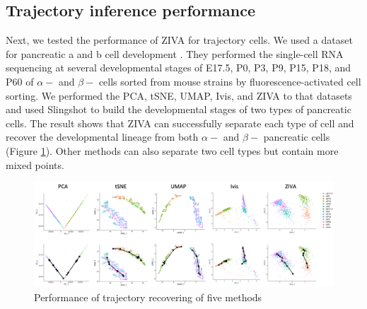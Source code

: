 \begin{table}[htb!]
\centering
\caption{ARI of clustering performance of seven methods on six datasets}
\label{ariall}
\end{table}

\clearpage

\subsection{Trajectory inference performance}
Next, we tested the performance of ZIVA for trajectory cells. We used a dataset for pancreatic a and b cell development \cite{qiu2017deciphering}. They performed the single-cell RNA sequencing at several developmental stages of E17.5, P0, P3, P9, P15, P18, and P60 of $\alpha-$ and $\beta-$ cells sorted from mouse strains by fluorescence-activated cell sorting. We performed the PCA, tSNE, UMAP, Ivis, and ZIVA to that datasets and used Slingshot \cite{street2018slingshot} to build the developmental stages of two types of pancreatic cells. The result shows that ZIVA can successfully separate each type of cell and recover the developmental lineage from both $\alpha-$ and $\beta-$ pancreatic cells (Figure \ref{traj}). Other methods can also separate two cell types but contain more mixed points.  
\begin{figure}[htb!]
    \centering
    \includegraphics[width=1\textwidth]{figures/myfigures/traj.png}
    \caption{Performance of trajectory recovering of five methods}
    \label{traj}
\end{figure}



